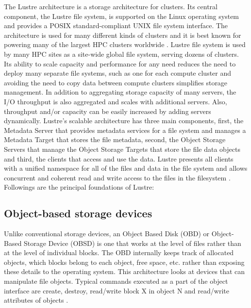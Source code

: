 \documentclass[9pt,twocolumn,twoside]{styles/osajnl}
\begin{document}
The Lustre architecture is a storage architecture for clusters. Its
central component, the Lustre file system, is supported on the Linux
operating system and provides a POSIX standard-compliant UNIX file
system interface. The architecture is used for many different kinds of
clusters and it is best known for powering many of the largest HPC
clusters worldwide \cite{www-manual}. Lustre file system is used by
many HPC sites as a site-wide global file system, serving dozens of
clusters. Its ability to scale capacity and performance for any need
reduces the need to deploy many separate file systems, such as one for
each compute cluster and avoiding the need to copy data between
compute clusters simplifies storage management. In addition to
aggregating storage capacity of many servers, the I/O throughput is
also aggregated and scales with additional servers. Also, throughput
and/or capacity can be easily increased by adding servers
dynamically. Lustre’s scalable architecture has three main components,
first, the Metadata Server that provides metadata services for a file
system and manages a Metadata Target that stores the file metadata,
second, the Object Storage Servers that manage the Object Storage
Targets that store the file data objects and third, the clients that
access and use the data. Lustre presents all clients with a unified
namespace for all of the files and data in the file system and allows
concurrent and coherent read and write access to the files in the
filesystem \cite{www-getstart}.
\newline
Followings are the principal foundations of Lustre: 

\subsection{Object-based storage devices}
Unlike conventional storage devices, an Object Based Disk (OBD) or
Object-Based Storage Device (OBSD) is one that works at the level of
files rather than at the level of individual blocks. The OBD
internally keeps track of allocated objects, which blocks belong to
each object, free space, etc. rather than exposing these details to
the operating system. This architecture looks at devices that can
manipulate file objects. Typical commands executed as a part of the
object interface are create, destroy, read/write block X in object N
and read/write attributes of objects \cite{www-obd-wikipedia}.
\end{document}
